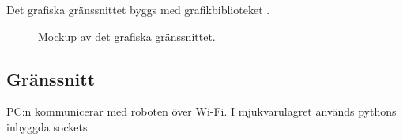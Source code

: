 \documentclass[a4paper,11pt]{article}
\begin{document}
Det grafiska gränssnittet byggs med grafikbiblioteket \cite{tkinter}.

\begin{figure}[h!]
    \caption{Mockup av det grafiska gränssnittet.}
    \label{fig:gui_mockup}
\end{figure}

\subsection{Gränssnitt} \label{ssec:PCInterface}

PC:n kommunicerar med roboten över Wi-Fi. I mjukvarulagret används pythons inbyggda sockets.
\end{document}
